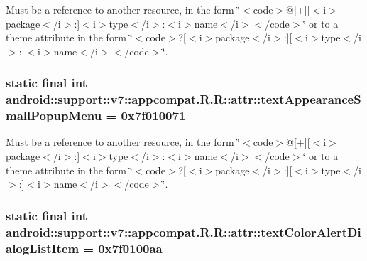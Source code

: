 Must be a reference to another resource, in the form \char`\"{}$<$code$>$@\mbox{[}+\mbox{]}\mbox{[}$<$i$>$package$<$/i$>$:\mbox{]}$<$i$>$type$<$/i$>$:$<$i$>$name$<$/i$>$$<$/code$>$\char`\"{} or to a theme attribute in the form \char`\"{}$<$code$>$?\mbox{[}$<$i$>$package$<$/i$>$:\mbox{]}\mbox{[}$<$i$>$type$<$/i$>$:\mbox{]}$<$i$>$name$<$/i$>$$<$/code$>$\char`\"{}. \hypertarget{classandroid_1_1support_1_1v7_1_1appcompat_1_1_r_1_1attr_d52cdefc52c681af6805ceab9520ac2b}{
\subsubsection[{textAppearanceSmallPopupMenu}]{\setlength{\rightskip}{0pt plus 5cm}static final int android::support::v7::appcompat.R.R::attr::textAppearanceSmallPopupMenu = 0x7f010071}}
\label{classandroid_1_1support_1_1v7_1_1appcompat_1_1_r_1_1attr_d52cdefc52c681af6805ceab9520ac2b}


Must be a reference to another resource, in the form \char`\"{}$<$code$>$@\mbox{[}+\mbox{]}\mbox{[}$<$i$>$package$<$/i$>$:\mbox{]}$<$i$>$type$<$/i$>$:$<$i$>$name$<$/i$>$$<$/code$>$\char`\"{} or to a theme attribute in the form \char`\"{}$<$code$>$?\mbox{[}$<$i$>$package$<$/i$>$:\mbox{]}\mbox{[}$<$i$>$type$<$/i$>$:\mbox{]}$<$i$>$name$<$/i$>$$<$/code$>$\char`\"{}. \hypertarget{classandroid_1_1support_1_1v7_1_1appcompat_1_1_r_1_1attr_3442668007bdf19dd1361bdeb45df381}{
\subsubsection[{textColorAlertDialogListItem}]{\setlength{\rightskip}{0pt plus 5cm}static final int android::support::v7::appcompat.R.R::attr::textColorAlertDialogListItem = 0x7f0100aa}}
\label{classandroid_1_1support_1_1v7_1_1appcompat_1_1_r_1_1attr_3442668007bdf19dd1361bdeb45df381}


